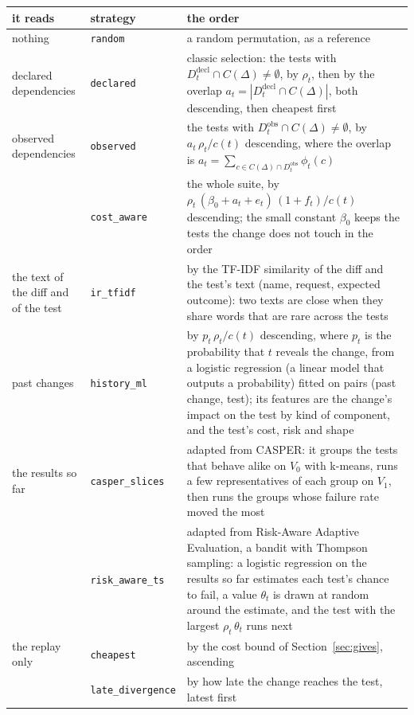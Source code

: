 \documentclass[11pt,a4paper]{article}
\newcommand{\strat}[1]{\texttt{#1}}
\newcommand{\Ddecl}{D^{\mathrm{decl}}_t}
\newcommand{\Dobs}{D^{\mathrm{obs}}_t}
\begin{document}
{\small
\begin{longtable}{@{}L{2.5cm}L{2.9cm}L{10.3cm}@{}}
\toprule
it reads & strategy & the order \\
\midrule
\endhead
\bottomrule
\endlastfoot
nothing & \strat{random} & a random permutation, as a reference \\
\addlinespace
declared dependencies & \strat{declared} &
  classic selection: the tests with $\Ddecl \cap C(\Delta) \neq \emptyset$, by $\rho_t$, then by the overlap
  $a_t = |\Ddecl \cap C(\Delta)|$, both descending, then cheapest first \\
\addlinespace
observed dependencies & \strat{observed} &
  the tests with $\Dobs \cap C(\Delta) \neq \emptyset$, by $a_t\, \rho_t / c(t)$ descending, where the overlap
  is $a_t = \sum_{c \in C(\Delta) \cap \Dobs} \phi_t(c)$ \\
\addlinespace
 & \strat{cost\_aware} &
  the whole suite, by $\rho_t\, (\beta_0 + a_t + e_t)\, (1 + f_t) / c(t)$ descending; the small constant $\beta_0$
  keeps the tests the change does not touch in the order \\
\addlinespace
the text of the diff and of the test & \strat{ir\_tfidf} &
  by the TF-IDF similarity of the diff and the test's text (name, request, expected outcome): two texts are close
  when they share words that are rare across the tests \\
\addlinespace
past changes & \strat{history\_ml} &
  by $p_t\, \rho_t / c(t)$ descending, where $p_t$ is the probability that $t$ reveals the change, from a logistic
  regression (a linear model that outputs a probability) fitted on pairs (past change, test); its features are
  the change's impact on the test by kind of component, and the test's cost, risk and shape \\
\addlinespace
the results so far & \strat{casper\_slices} &
  adapted from CASPER: it groups the tests that behave alike on $V_0$ with k-means, runs a few representatives of
  each group on $V_1$, then runs the groups whose failure rate moved the most \\
\addlinespace
 & \strat{risk\_aware\_ts} &
  adapted from Risk-Aware Adaptive Evaluation, a bandit with Thompson sampling: a logistic regression on the
  results so far estimates each test's chance to fail, a value $\theta_t$ is drawn at random around the estimate,
  and the test with the largest $\rho_t\, \theta_t$ runs next \\
\addlinespace
the replay only & \strat{cheapest} & by the cost bound of Section~\ref{sec:gives}, ascending \\
\addlinespace
 & \strat{late\_divergence} & by how late the change reaches the test, latest first \\
\end{longtable}
}
\end{document}
